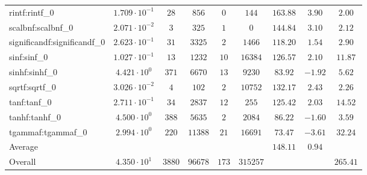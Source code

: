 \begin{tabular}{|l|c|c|c|c|c|c|c|c|}
rintf:rintf\_0               & $ 1.709 \cdot 10^{-1} $ & $ 28     $ & $ 856   $ & $ 0   $ & $ 144    $ & $ 163.88      $ & $ 3.90    $ & $ 2.00    $ \\
scalbnf:scalbnf\_0           & $ 2.071 \cdot 10^{-2} $ & $ 3      $ & $ 325   $ & $ 1   $ & $ 0      $ & $ 144.84      $ & $ 3.10    $ & $ 2.12    $ \\
significandf:significandf\_0 & $ 2.623 \cdot 10^{-1} $ & $ 31     $ & $ 3325  $ & $ 2   $ & $ 1466   $ & $ 118.20      $ & $ 1.54    $ & $ 2.90    $ \\
sinf:sinf\_0                 & $ 1.027 \cdot 10^{-1} $ & $ 13     $ & $ 1232  $ & $ 10  $ & $ 16384  $ & $ 126.57      $ & $ 2.10    $ & $ 11.87   $ \\
sinhf:sinhf\_0               & $ 4.421 \cdot 10^{0}  $ & $ 371    $ & $ 6670  $ & $ 13  $ & $ 9230   $ & $ 83.92       $ & $ -1.92   $ & $ 5.62    $ \\
sqrtf:sqrtf\_0               & $ 3.026 \cdot 10^{-2} $ & $ 4      $ & $ 102   $ & $ 2   $ & $ 10752  $ & $ 132.17      $ & $ 2.43    $ & $ 2.26    $ \\
tanf:tanf\_0                 & $ 2.711 \cdot 10^{-1} $ & $ 34     $ & $ 2837  $ & $ 12  $ & $ 255    $ & $ 125.42      $ & $ 2.03    $ & $ 14.52   $ \\
tanhf:tanhf\_0               & $ 4.500 \cdot 10^{0}  $ & $ 388    $ & $ 5635  $ & $ 2   $ & $ 2084   $ & $ 86.22       $ & $ -1.60   $ & $ 3.59    $ \\
tgammaf:tgammaf\_0           & $ 2.994 \cdot 10^{0}  $ & $ 220    $ & $ 11388 $ & $ 21  $ & $ 16691  $ & $ 73.47       $ & $ -3.61   $ & $ 32.24   $ \\
\hline
Average                      & $                     $ & $        $ & $       $ & $     $ & $        $ & $ 148.11      $ & $ 0.94    $ & $         $ \\
\hline
Overall                      & $ 4.350 \cdot 10^{1}  $ & $ 3880   $ & $ 96678 $ & $ 173 $ & $ 315257 $ & $             $ & $         $ & $ 265.41  $ \\
\hline
\end{tabular}
